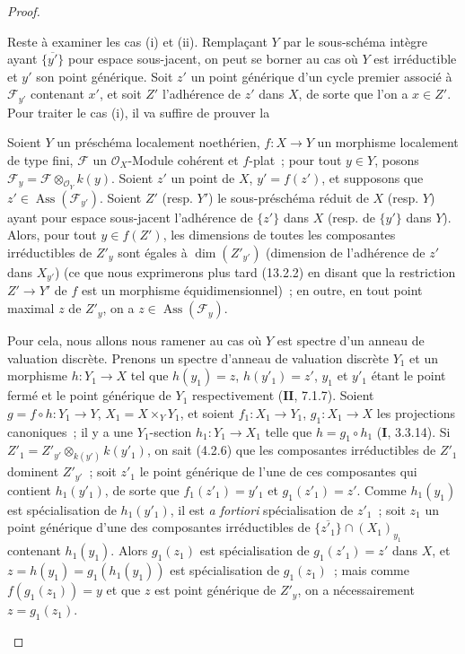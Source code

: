 \begin{proof}
\begin{env}[12.1.1.4]
\label{IV.12.1.1.4-fr}
Reste à examiner les cas (i) et (ii). Remplaçant $Y$ par le sous-schéma intègre
ayant $\overline{\{y'\}}$ pour espace sous-jacent, on peut se borner au cas où
$Y$ est irréductible et $y'$ son point générique. Soit $z'$ un point générique
d'un cycle premier associé à $\mathcal F_{y'}$
contenant $x'$, et soit $Z'$ l'adhérence de $z'$ dans $X$, de sorte que l'on a
$x\in Z'$. Pour traiter le cas (i), il va suffire de prouver la

\begin{proposition}[12.1.1.5]
\label{IV.12.1.1.5-fr}
Soient $Y$ un préschéma localement noethérien, $f:X\to Y$ un morphisme
localement de type fini, $\mathcal F$ un $\mathcal O_X$-Module cohérent et
$f$-plat~; pour tout $y\in Y$, posons
$\mathcal F_y=\mathcal F\otimes_{\mathcal O_Y}k(y)$. Soient $z'$ un point de
$X$, $y'=f(z')$, et supposons que $z'\in\operatorname{Ass}(\mathcal F_{y'})$.
Soient $Z'$ (resp. $Y'$) le sous-préschéma réduit de $X$ (resp. $Y$) ayant
pour espace sous-jacent l'adhérence de $\{z'\}$ dans $X$ (resp. de $\{y'\}$
dans $Y$). Alors, pour tout $y\in f(Z')$, les dimensions de toutes les
composantes irréductibles de $Z'_y$ sont égales à $\dim(Z'_{y'})$ (dimension
de l'adhérence de $z'$ dans $X_{y'}$) (ce que nous exprimerons plus tard
(13.2.2) en disant que la restriction $Z'\to Y'$ de $f$ est un morphisme
équidimensionnel)~; en outre, en tout point maximal $z$ de $Z'_y$, on a
$z\in\operatorname{Ass}(\mathcal F_y)$.
\end{proposition}

Pour cela, nous allons nous ramener au cas où $Y$ est spectre d'un anneau de
valuation discrète. Prenons un spectre d'anneau de valuation discrète $Y_1$ et
un morphisme $h:Y_1\to X$ tel que $h(y_1)=z$, $h(y'_1)=z'$, $y_1$ et $y'_1$
étant le point fermé et le point générique de $Y_1$ respectivement
($\mathbf{II}$, 7.1.7). Soient $g=f\circ h:Y_1\to Y$,
$X_1=X\times_YY_1$, et soient $f_1:X_1\to Y_1$, $g_1:X_1\to X$ les projections
canoniques~; il y a une $Y_1$-section $h_1:Y_1\to X_1$ telle que
$h=g_1\circ h_1$ ($\mathbf I$, 3.3.14). Si
$Z'_1=Z'_{y'}\otimes_{k(y')}k(y'_1)$, on sait (4.2.6) que les composantes
irréductibles de $Z'_1$ dominent $Z'_{y'}$~; soit $z'_1$ le point générique de
l'une de ces composantes qui contient $h_1(y'_1)$, de sorte que
$f_1(z'_1)=y'_1$ et $g_1(z'_1)=z'$. Comme $h_1(y_1)$ est spécialisation de
$h_1(y'_1)$, il est \emph{a fortiori} spécialisation de $z'_1$~; soit $z_1$ un
point générique d'une des composantes irréductibles de
$\overline{\{z'_1\}}\cap(X_1)_{y_1}$ contenant $h_1(y_1)$. Alors $g_1(z_1)$
est spécialisation de $g_1(z'_1)=z'$ dans $X$, et
$z=h(y_1)=g_1(h_1(y_1))$ est spécialisation de $g_1(z_1)$~; mais comme
$f(g_1(z_1))=y$ et que $z$ est point générique de $Z'_y$, on a nécessairement
$z=g_1(z_1)$.


\end{env}
\end{proof}
